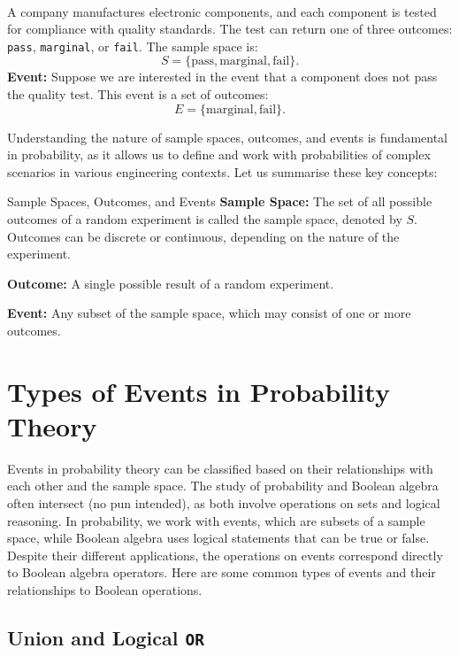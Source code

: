 \begin{example} \\
A company manufactures electronic components, and each component is tested for compliance with quality standards. The test can return one of three outcomes: \texttt{pass}, \texttt{marginal}, or \texttt{fail}. The sample space is:
\[
S = \{\text{pass}, \text{marginal}, \text{fail}\}.
\]
\textbf{Event:} Suppose we are interested in the event that a component does not pass the quality test. This event is a set of outcomes:
\[
E = \{\text{marginal}, \text{fail}\}.
\]
\end{example}

Understanding the nature of sample spaces, outcomes, and events is fundamental in probability, as it allows us to define and work with probabilities of complex scenarios in various engineering contexts. Let us summarise these key concepts:

\begin{definition}{Sample Spaces, Outcomes, and Events}
    \textbf{Sample Space:} The set of all possible outcomes of a random experiment is called the sample space, denoted by \( S \). Outcomes can be discrete or continuous, depending on the nature of the experiment.
    
    \textbf{Outcome:} A single possible result of a random experiment.
    
    \textbf{Event:} Any subset of the sample space, which may consist of one or more outcomes.
\end{definition}

\section{Types of Events in Probability Theory}
\label{subsec:types_events}

Events in probability theory can be classified based on their relationships with each other and the sample space. The study of probability and Boolean algebra often intersect (no pun intended), as both involve operations on sets and logical reasoning. In probability, we work with events, which are subsets of a sample space, while Boolean algebra uses logical statements that can be true or false. Despite their different applications, the operations on events correspond directly to Boolean algebra operators. Here are some common types of events and their relationships to Boolean operations.

\subsection*{Union and Logical \texttt{OR}}

